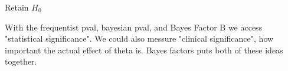 \documentclass[12pt]{article}
\begin{document}
\begin{enumerate}
Retain $H_0$ 




    With the frequentist pval, bayesian pval, and Bayes Factor B we access "statistical significance". We could also messure "clinical significance", how important the actual effect of theta is. 
    Bayes factors puts both of these ideas together. 

\end{enumerate}
\end{document}
